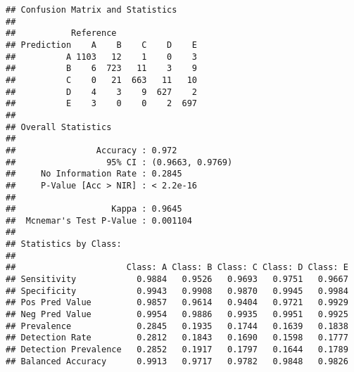 \documentclass[]{article}
\newenvironment{Shaded}{\begin{snugshade}}{\end{snugshade}}
\newcommand{\KeywordTok}[1]{\textcolor[rgb]{0.13,0.29,0.53}{\textbf{{#1}}}}
\newcommand{\DataTypeTok}[1]{\textcolor[rgb]{0.13,0.29,0.53}{{#1}}}
\newcommand{\DecValTok}[1]{\textcolor[rgb]{0.00,0.00,0.81}{{#1}}}
\newcommand{\StringTok}[1]{\textcolor[rgb]{0.31,0.60,0.02}{{#1}}}
\newcommand{\NormalTok}[1]{{#1}}
\begin{document}
\begin{Shaded}
\end{Shaded}

\begin{verbatim}
## Confusion Matrix and Statistics
## 
##           Reference
## Prediction    A    B    C    D    E
##          A 1103   12    1    0    3
##          B    6  723   11    3    9
##          C    0   21  663   11   10
##          D    4    3    9  627    2
##          E    3    0    0    2  697
## 
## Overall Statistics
##                                           
##                Accuracy : 0.972           
##                  95% CI : (0.9663, 0.9769)
##     No Information Rate : 0.2845          
##     P-Value [Acc > NIR] : < 2.2e-16       
##                                           
##                   Kappa : 0.9645          
##  Mcnemar's Test P-Value : 0.001104        
## 
## Statistics by Class:
## 
##                      Class: A Class: B Class: C Class: D Class: E
## Sensitivity            0.9884   0.9526   0.9693   0.9751   0.9667
## Specificity            0.9943   0.9908   0.9870   0.9945   0.9984
## Pos Pred Value         0.9857   0.9614   0.9404   0.9721   0.9929
## Neg Pred Value         0.9954   0.9886   0.9935   0.9951   0.9925
## Prevalence             0.2845   0.1935   0.1744   0.1639   0.1838
## Detection Rate         0.2812   0.1843   0.1690   0.1598   0.1777
## Detection Prevalence   0.2852   0.1917   0.1797   0.1644   0.1789
## Balanced Accuracy      0.9913   0.9717   0.9782   0.9848   0.9826
\end{verbatim}

\begin{Shaded}
\end{Shaded}
\end{document}
